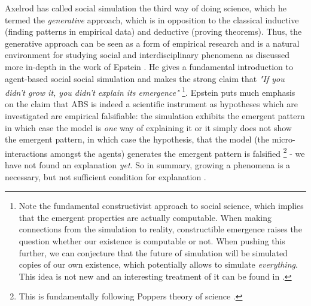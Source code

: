 Axelrod \cite{axelrod_advancing_1997, axelrod_guide_2006} has called social simulation the third way of doing science, which he termed the \textit{generative} approach, which is in opposition to the classical inductive (finding patterns in empirical data) and deductive (proving theorems). Thus, the generative approach can be seen as a form of empirical research and is a natural environment for studying social and interdisciplinary phenomena as discussed more in-depth in the work of Epstein \cite{epstein_chapter_2006, epstein_generative_2012}. He gives a fundamental introduction to agent-based social social simulation and makes the strong claim that \textit{"If you didn't grow it, you didn't explain its emergence"} \footnote{Note the fundamental constructivist approach to social science, which implies that the emergent properties are actually computable. When making connections from the simulation to reality, constructible emergence raises the question whether our existence is computable or not. When pushing this further, we can conjecture that the future of simulation will be simulated copies of our own existence, which potentially allows to simulate \textit{everything}. This idea is not new and an interesting treatment of it can be found in \cite{bostrom_are_2003, steinhart_theological_2010}.}. Epstein puts much emphasis on the claim that ABS is indeed a scientific instrument as hypotheses which are investigated are empirical falsifiable: the simulation exhibits the emergent pattern in which case the model is \textit{one} way of explaining it or it simply does not show the emergent pattern, in which case the hypothesis, that the model (the micro-interactions amongst the agents) generates the emergent pattern is falsified \footnote{This is fundamentally following Poppers theory of science \cite{popper_logic_2002}.} - we have not found an explanation \textit{yet}. So in summary, growing a phenomena is a necessary, but not sufficient condition for explanation \cite{epstein_chapter_2006}.


